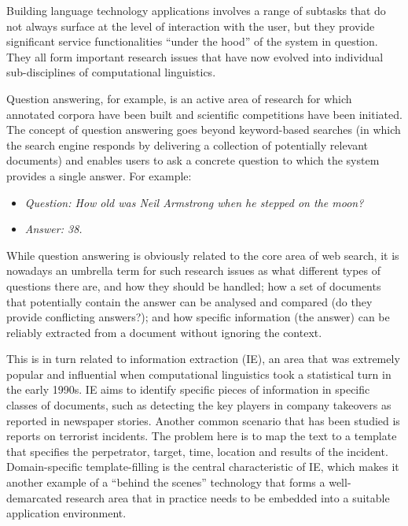 \documentclass[]{../../metanetpaper}
\begin{document}
\begin{Parallel}[c]{77mm}{77mm}
{Building language technology applications involves a range of subtasks that do
not always surface at the level of interaction with the user, but they provide
significant service functionalities “under the hood” of the system in question.
They all form important research issues that have now evolved into individual
sub-disciplines of computational linguistics.

Question answering, for example, is an active area of research for which
annotated corpora have been built and scientific competitions have been
initiated. The concept of question answering goes beyond keyword-based searches
(in which the search engine responds by delivering a collection of potentially
relevant documents) and enables users to ask a concrete question to which the
system provides a single answer. For example:
\begin{itemize}
\item[] \textit{Question: How old was Neil Armstrong when he stepped on the
              moon?}

\item[] \textit{Answer: 38.}
\end{itemize}
While question answering is obviously related to the core area of web search,
it is nowadays an umbrella term for such research issues as what different
types of questions there are, and how they should be handled; how a set of
documents that potentially contain the answer can be analysed and compared (do
they provide conflicting answers?); and how specific information (the answer)
can be reliably extracted from a document without ignoring the context.

This is in turn related to information extraction (IE), an area that was
extremely popular and influential when computational linguistics took a
statistical turn in the early 1990s. IE aims to identify specific pieces of
information in specific classes of documents, such as detecting the key players
in company takeovers as reported in newspaper stories. Another common scenario
that has been studied is reports on terrorist incidents. The problem here is to
map the text to a template that specifies the perpetrator, target, time,
location and results of the incident. Domain-specific template-filling is the
central characteristic of IE, which makes it another example of a “behind the
scenes” technology that forms a well-demarcated research area that in practice
needs to be embedded into a suitable application environment.


}
\end{Parallel}
\end{document}
